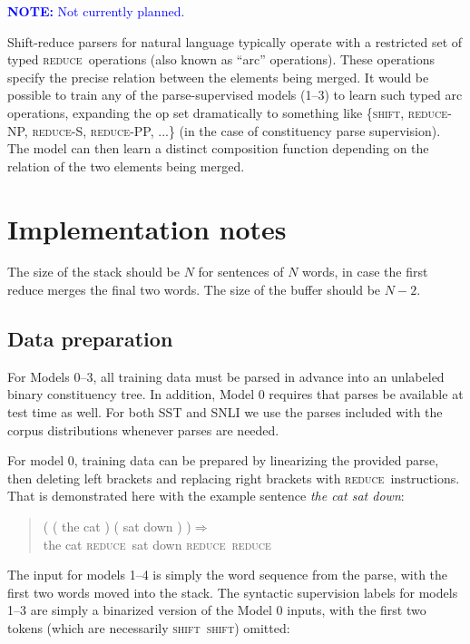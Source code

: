 \documentclass[11pt,letterpaper]{article}
\newcommand{\shift}{\textsc{shift}}
\newcommand{\reduce}{\textsc{reduce}}
\def\ii#1{\textit{#1}}
\newcommand\note[1]{\textcolor{blue}{\textbf{NOTE:} #1}}
\begin{document}
\note{Not currently planned.}

Shift-reduce parsers for natural language typically operate with a restricted set of typed \reduce~operations (also known as ``arc'' operations). These operations specify the precise relation between the elements being merged. It would be possible to train any of the parse-supervised models (1--3) to learn such typed arc operations, expanding the op set dramatically to something like \{\shift, \reduce-NP, \reduce-S, \reduce-PP, ...\} (in the case of constituency parse supervision). The model can then learn a distinct composition function depending on the relation of the two elements being merged.


\section{Implementation notes}

The size of the stack should be $N$ for sentences of $N$ words, in case the first reduce merges the final two words. The size of the buffer should be $N - 2$.

\subsection{Data preparation}

For Models 0--3, all training data must be parsed in advance into an unlabeled binary constituency tree. In addition, Model 0 requires that  parses be available at test time as well. For both SST and SNLI we use the parses included with the corpus distributions whenever parses are needed. 

For model 0, training data can be prepared by linearizing the provided parse, then deleting left brackets and replacing right brackets with \reduce~instructions. That is demonstrated here with the example sentence \ii{the cat sat down}:

\begin{quote}\small
( ( the cat ) ( sat down ) )$\Rightarrow$\\
the cat \reduce~sat down \reduce~\reduce
\end{quote}

The input for models 1--4 is simply the word sequence from the parse, with the first two words moved into the stack. The syntactic supervision labels for models 1--3 are simply a binarized version of the Model 0 inputs, with the first two tokens (which are necessarily \shift~\shift) omitted: 
\end{document}
